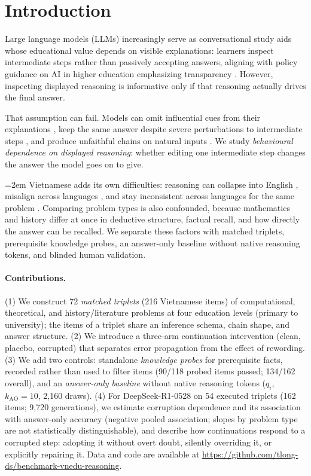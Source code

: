 \section{Introduction}

Large language models (LLMs) increasingly serve as conversational study aids whose educational value depends on visible explanations: learners inspect intermediate steps rather than passively accepting answers, aligning with policy guidance on AI in higher education emphasizing transparency \citep{moet2026circular49}. However, inspecting displayed reasoning is informative only if that reasoning actually drives the final answer.

That assumption can fail. Models can omit influential cues from their explanations \citep{turpin2023}, keep the same answer despite severe perturbations to intermediate steps \citep{lanham2023}, and produce unfaithful chains on natural inputs \citep{arcuschin2026}. We study \emph{behavioural dependence on displayed reasoning}: whether editing one intermediate step changes the answer the model goes on to give.

{\emergencystretch=2em Vietnamese adds its own difficulties: reasoning can collapse into English \citep{oscd2026}, misalign across languages \citep{ovalle2025beg}, and stay inconsistent across languages for the same problem \citep{zhao2026}. Comparing problem types is also confounded, because mathematics and history differ at once in deductive structure, factual recall, and how directly the answer can be recalled. We separate these factors with matched triplets, prerequisite knowledge probes, an answer-only baseline without native reasoning tokens, and blinded human validation.\par}

\paragraph{Contributions.}
(1) We construct 72 \emph{matched triplets} (216 Vietnamese items) of computational, theoretical, and history/\allowbreak literature problems at four education levels (primary to university); the items of a triplet share an inference schema, chain shape, and answer structure.
(2) We introduce a three-arm continuation intervention (clean, placebo, corrupted) that separates error propagation from the effect of rewording.
(3) We add two controls: standalone \emph{knowledge probes} for prerequisite facts, recorded rather than used to filter items (90/118 probed items passed; 134/162 overall), and an \emph{answer-only baseline} without native reasoning tokens ($q_i$, $k_{\mathrm{AO}}=10$, 2,160 draws).
(4) For DeepSeek-R1-0528 on 54 executed triplets (162 items; 9,720 generations), we estimate corruption dependence and its association with answer-only accuracy (negative pooled association; slopes by problem type are not statistically distinguishable), and describe how continuations respond to a corrupted step: adopting it without overt doubt, silently overriding it, or explicitly repairing it. Data and code are available at \url{https://github.com/tlong-ds/benchmark-vnedu-reasoning}.

